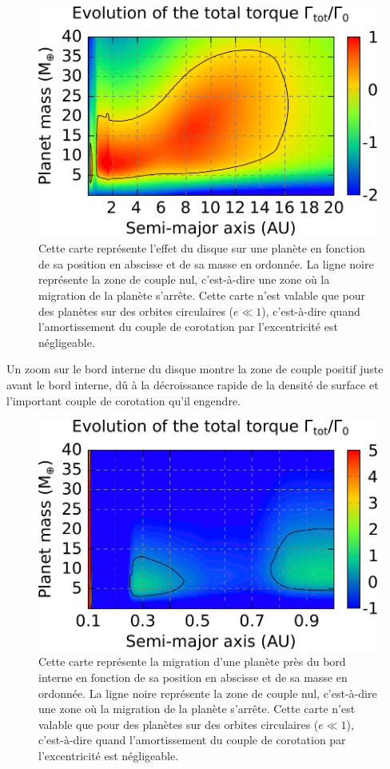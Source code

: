 \begin{figure}[htbp]
\centering
\includegraphics[width=0.65\linewidth]{figure/HSE/HSE_migration_map.pdf}
\caption[Carte de migration dans le disque considéré.]{Cette carte représente l'effet du disque sur une planète en fonction de
sa position en abscisse et de sa masse en ordonnée. La ligne noire représente la zone de couple nul, c'est-à-dire une zone où la
migration de la planète s'arrête. Cette carte n'est valable que pour des planètes sur des orbites circulaires ($e\ll1$), c'est-à-dire quand l'amortissement du couple de corotation par l'excentricité est négligeable.}\label{fig:migration_map_HSE}
\end{figure}

Un zoom sur le bord interne du disque  montre la zone de couple positif juste avant le bord interne, dû à la décroissance rapide de la densité de surface et l'important couple de corotation qu'il engendre.

\begin{figure}[htbp]
\centering
\includegraphics[width=0.65\linewidth]{figure/HSE/HSE_zoom-in.pdf}
\caption[Carte de migration près du bord interne du disque.]{Cette carte représente la migration d'une planète près du bord
interne en fonction de sa position en abscisse et de sa masse en ordonnée. La ligne noire représente la zone de couple nul,
c'est-à-dire une zone où la migration de la planète s'arrête. Cette carte n'est valable que pour des planètes sur des orbites
circulaires ($e\ll1$), c'est-à-dire quand l'amortissement du couple de corotation par l'excentricité est
négligeable.}\label{fig:HSE_mig_zoom-in}
\end{figure}

